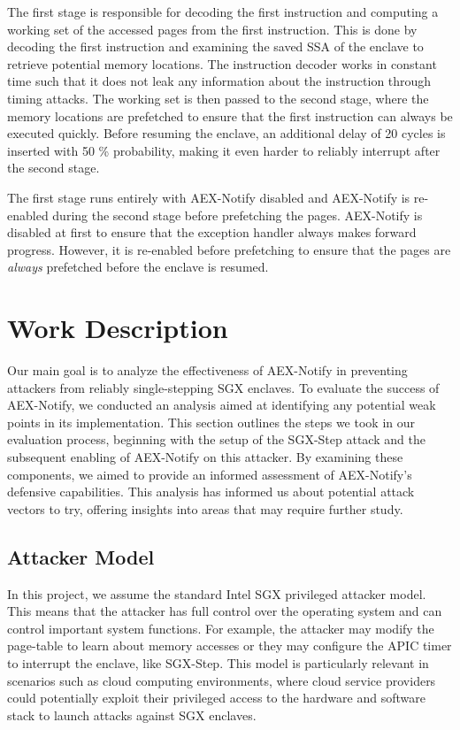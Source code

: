 \documentclass{llncs}
\begin{document}
The first stage is responsible for decoding the first instruction and computing
a working set of the accessed pages from the first instruction.
This is done by decoding the first instruction and examining the saved SSA of
the enclave to retrieve potential memory locations.
The instruction decoder works in constant time \cite{TODO} such that it does
not leak any information about the instruction through timing attacks.
The working set is then passed to the second stage, where the memory locations
are prefetched to ensure that the first instruction can always be executed
quickly.
Before resuming the enclave, an additional delay of 20 cycles is inserted with 50 \% probability,
making it even harder to reliably interrupt after the second stage.


The first stage runs entirely with AEX-Notify disabled
and AEX-Notify is re-enabled during the second stage before prefetching the pages.
AEX-Notify is disabled at first to ensure that the exception handler always makes forward progress.
However, it is re-enabled before prefetching to ensure that the pages are \emph{always} prefetched
before the enclave is resumed.

\section{Work Description}

Our main goal is to analyze the effectiveness of AEX-Notify
in preventing attackers from reliably single-stepping SGX enclaves.
To evaluate the success of AEX-Notify,
we conducted an analysis aimed at identifying any potential weak points in its implementation.
This section outlines the steps we took in our evaluation process,
beginning with the setup of the SGX-Step attack and
the subsequent enabling of AEX-Notify on this attacker.
By examining these components,
we aimed to provide an informed assessment of AEX-Notify’s defensive capabilities.
This analysis has informed us about potential attack vectors to try,
offering insights into areas that may require further study.

\subsection{Attacker Model}

In this project, we assume the standard Intel SGX privileged attacker model.
This means that the attacker has full control over the operating system
and can control important system functions.
For example, the attacker may modify the page-table to learn about memory accesses
or they may configure the APIC timer to interrupt the enclave, like SGX-Step.
This model is particularly relevant in scenarios such as cloud computing
environments, where cloud service providers could potentially exploit their
privileged access to the hardware and software stack to launch attacks against SGX enclaves.
\end{document}
